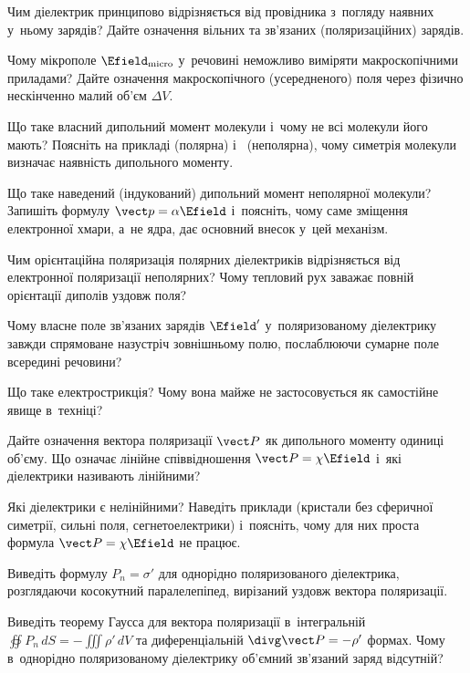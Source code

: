 \begin{Questions}
	\begin{quizlist}
		\item Чим діелектрик принципово відрізняється від провідника з~погляду наявних у~ньому
		зарядів? Дайте означення вільних та зв'язаних (поляризаційних) зарядів.
		\item Чому мікрополе $\Efield_\text{micro}$ у~речовині неможливо виміряти
		макроскопічними приладами? Дайте означення макроскопічного (усередненого) поля через
		фізично нескінченно малий об'єм $\Delta V$.
		\item Що таке власний дипольний момент молекули і~чому не всі молекули його мають?
		Поясніть на прикладі  (полярна) і~ (неполярна), чому симетрія
		молекули визначає наявність дипольного моменту.
		\item Що таке наведений (індукований) дипольний момент неполярної молекули? Запишіть
		формулу $\vect p = \alpha\Efield$ і~поясніть, чому саме зміщення електронної хмари,
		а~не ядра, дає основний внесок у~цей механізм.
		\item Чим орієнтаційна поляризація полярних діелектриків відрізняється від електронної
		поляризації неполярних? Чому тепловий рух заважає повній орієнтації диполів уздовж
		поля?
		\item Чому власне поле зв'язаних зарядів $\Efield'$ у~поляризованому діелектрику
		завжди спрямоване назустріч зовнішньому полю, послаблюючи сумарне поле всередині
		речовини?
		\item Що таке електрострикція? Чому вона майже не застосовується як самостійне явище
		в~техніці?
		\item Дайте означення вектора поляризації $\vect P$ як дипольного моменту одиниці
		об'єму. Що означає лінійне співвідношення $\vect P = \chi\Efield$ і~які діелектрики
		називають лінійними?
		\item Які діелектрики є нелінійними? Наведіть приклади (кристали без сферичної
		симетрії, сильні поля, сегнетоелектрики) і~поясніть, чому для них проста формула
		$\vect P=\chi\Efield$ не працює.
		\item Виведіть формулу $P_n = \sigma'$ для однорідно поляризованого діелектрика,
		розглядаючи косокутний паралелепіпед, вирізаний уздовж вектора поляризації.
		\item Виведіть теорему Гаусса для вектора поляризації в~інтегральній $\oiint P_n\,dS =
			-\iiint \rho'\,dV$ та диференціальній $\divg\vect P = -\rho'$ формах. Чому
		в~однорідно поляризованому діелектрику об'ємний зв'язаний заряд відсутній?

\end{quizlist}
\end{Questions}
